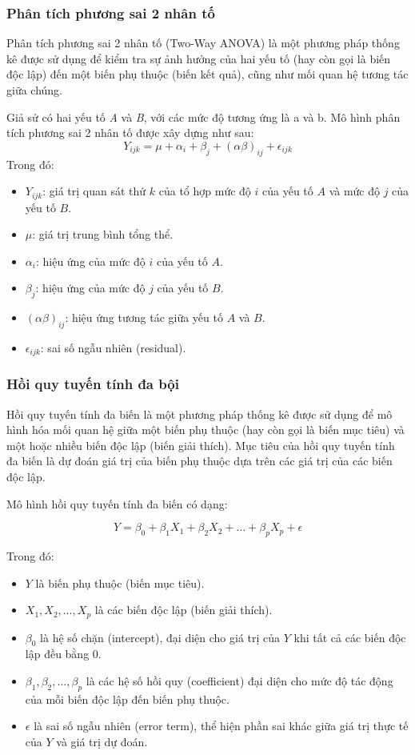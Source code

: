 \subsubsection{Phân tích phương sai 2 nhân tố}
Phân tích phương sai 2 nhân tố (Two-Way ANOVA) là một phương pháp thống kê được sử dụng để kiểm tra sự ảnh hưởng của hai yếu tố (hay còn gọi là biến độc lập) đến một biến phụ thuộc (biến kết quả), cũng như mối quan hệ tương tác giữa chúng.

Giả sử có hai yếu tố \textit{A} và \textit{B}, với các mức độ tương ứng là a và b. Mô hình phân tích phương sai 2 nhân tố được xây dựng như sau:
\[
Y_{ijk} = \mu + \alpha_i + \beta_j + (\alpha \beta)_{ij} + \epsilon_{ijk}
\]
Trong đó:
\begin{itemize}
  \item \( Y_{ijk} \): giá trị quan sát thứ \( k \) của tổ hợp mức độ \( i \) của yếu tố \( A \) và mức độ \( j \) của yếu tố \( B \).
  \item \( \mu \): giá trị trung bình tổng thể.
  \item \( \alpha_i \): hiệu ứng của mức độ \( i \) của yếu tố \( A \).
  \item \( \beta_j \): hiệu ứng của mức độ \( j \) của yếu tố \( B \).
  \item \( (\alpha\beta)_{ij} \): hiệu ứng tương tác giữa yếu tố \( A \) và \( B \).
  \item \( \epsilon_{ijk} \): sai số ngẫu nhiên (residual).
\end{itemize}
\subsubsection{Hồi quy tuyến tính đa bội}
Hồi quy tuyến tính đa biến là một phương pháp thống kê được sử dụng để mô hình hóa mối quan hệ giữa một biến phụ thuộc (hay còn gọi là biến mục tiêu) và một hoặc nhiều biến độc lập (biến giải thích). Mục tiêu của hồi quy tuyến tính đa biến là dự đoán giá trị của biến phụ thuộc dựa trên các giá trị của các biến độc lập.

\pagebreak

Mô hình hồi quy tuyến tính đa biến có dạng:

\[
Y = \beta_0 + \beta_1 X_1 + \beta_2 X_2 + \dots + \beta_p X_p + \epsilon
\]

Trong đó:
\begin{itemize}
  \item \(Y\) là biến phụ thuộc (biến mục tiêu).
  \item \(X_1, X_2, \dots, X_p\) là các biến độc lập (biến giải thích).
  \item \(\beta_0\) là hệ số chặn (intercept), đại diện cho giá trị của \(Y\) khi tất cả các biến độc lập đều bằng 0.
  \item \(\beta_1, \beta_2, \dots, \beta_p\) là các hệ số hồi quy (coefficient) đại diện cho mức độ tác động của mỗi biến độc lập đến biến phụ thuộc.
  \item \(\epsilon\) là sai số ngẫu nhiên (error term), thể hiện phần sai khác giữa giá trị thực tế của \(Y\) và giá trị dự đoán.
\end{itemize}

